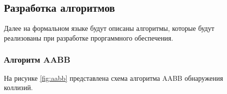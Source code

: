 \subsection{Разработка алгоритмов}

Далее на формальном языке будут описаны алгоритмы, которые будут реализованы при разработке проргаммного обеспечения.





\subsubsection{Алгоритм AABB}

На рисунке \ref{fig:aabb} представлена схема алгоритма AABB обнаружения коллизий.

